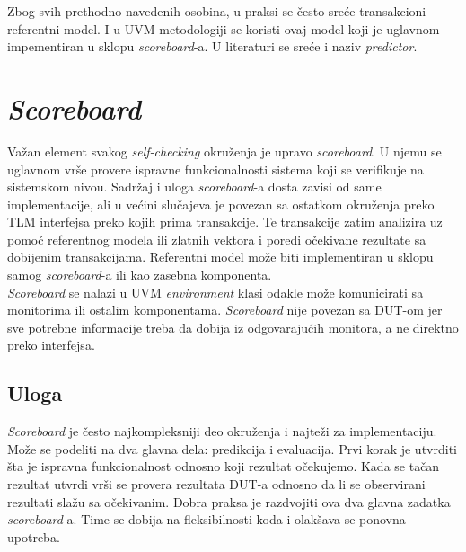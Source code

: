 Zbog svih prethodno navedenih osobina, u praksi se često sreće transakcioni
referentni model. I u UVM metodologiji se koristi ovaj model koji je uglavnom
impementiran u sklopu \emph{scoreboard}-a. U literaturi se sreće i naziv
\emph{predictor}.


\section{\emph{Scoreboard}}

Važan element svakog \emph{self-checking} okruženja je upravo \emph{scoreboard}.
U njemu se uglavnom vrše provere ispravne funkcionalnosti sistema koji se
verifikuje na sistemskom nivou. Sadržaj i uloga \emph{scoreboard}-a dosta zavisi
od same implementacije, ali u većini slučajeva je povezan sa ostatkom okruženja
preko TLM interfejsa preko kojih prima transakcije. Te transakcije zatim
analizira uz pomoć referentnog modela ili zlatnih vektora i poredi očekivane
rezultate sa dobijenim transakcijama. Referentni model može biti implementiran u
sklopu samog \emph{scoreboard}-a ili kao zasebna komponenta.\\

\emph{Scoreboard} se nalazi u UVM \emph{environment} klasi odakle
može komunicirati sa monitorima ili ostalim komponentama.
\emph{Scoreboard} nije povezan sa DUT-om jer sve potrebne informacije treba da
dobija iz odgovarajućih monitora, a ne direktno preko interfejsa.


\subsection{Uloga}

\emph{Scoreboard} je često najkompleksniji deo okruženja i najteži za
implementaciju. Može se podeliti na dva glavna dela: predikcija i evaluacija.
Prvi korak je utvrditi šta je ispravna funkcionalnost odnosno koji rezultat
očekujemo. Kada se tačan rezultat utvrdi vrši se provera rezultata DUT-a odnosno
da li se observirani rezultati slažu sa očekivanim. Dobra praksa je razdvojiti
ova dva glavna zadatka \emph{scoreboard}-a. Time se dobija na fleksibilnosti
koda i olakšava se ponovna upotreba.\\

